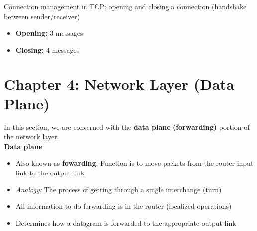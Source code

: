 \documentclass{article}
\begin{document}
Connection management in TCP: opening and closing a connection (handshake between sender/receiver)
\begin{itemize}
    \item \textbf{Opening:} 3 messages
    \item \textbf{Closing:} 4 messages
\end{itemize}
\newpage

\section{Chapter 4: Network Layer (Data Plane)}
In this section, we are concerned with the \textbf{data plane (forwarding)} portion of the network layer. \\
\textbf{Data plane}
\begin{itemize}
    \item Also known as \textbf{fowarding}: Function is to move packets from the router input link to the output link
    \item \textit{Analogy:} The process of getting through a single interchange (turn)
    \item All information to do forwarding is in the router (localized operations)
    \item Determines how a datagram is forwarded to the appropriate output link
\end{itemize}

\end{document}
